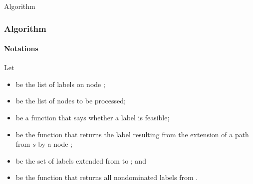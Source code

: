 \begin{frame}
  \begin{center}
    \Huge Algorithm
  \end{center}
\end{frame}

\begin{frame}
  \frametitle{Algorithm}
  \framesubtitle{Notations}
  Let
  \begin{itemize}
    \item {} be the list of labels on node ;
    \item {} be the list of nodes to be processed;
    \item \blue{\[
        f(S_i) =  
        \begin{cases}
          \text{\textcolor{black}{true}},  & \text{\textcolor{black}{if} }      \forall r \in R (l_i^r \leqslant e_i^r) \wedge \forall j \in V (v_i^j \leqslant 1)\\
          \text{\textcolor{black}{false}}, & \text{\textcolor{black}{otherwise}}
        \end{cases}
    \]} be a function that says whether a label is feasible;
    \item {} be the function that returns the label resulting from the extension of a path  from $s$ by a node ;
    \item {} be the set of labels extended from  to ; and
    \item {} be the function that returns all nondominated labels from \blue{$\Lambda$}.
  \end{itemize}
\end{frame}

